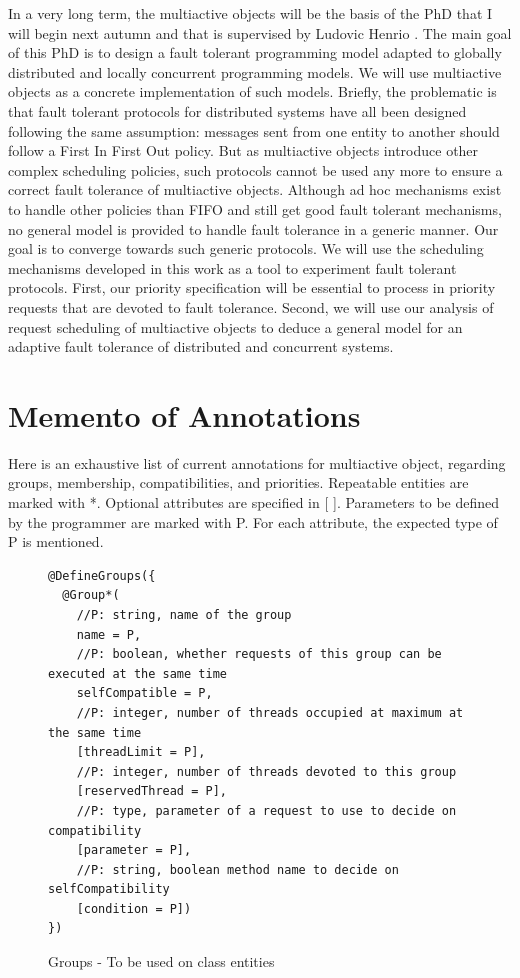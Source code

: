 \documentclass[11pt]{report}
\begin{document}
In a very long term, the multiactive objects will be the basis of the PhD that I will begin next autumn and that is supervised by Ludovic Henrio \cite{ref:these}. The main goal of this PhD is to design a fault tolerant programming model adapted to globally distributed and locally concurrent programming models. We will use multiactive objects as a concrete implementation of such models. Briefly, the problematic is that fault tolerant protocols for distributed systems have all been designed following the same assumption: messages sent from one entity to another should follow a First In First Out policy. But as multiactive objects introduce other complex scheduling policies, such protocols cannot be used any more to ensure a correct fault tolerance of multiactive objects. Although ad hoc mechanisms exist to handle other policies than FIFO and still get good fault tolerant mechanisms, no general model is provided to handle fault tolerance in a generic manner. Our goal is to converge towards such generic protocols. We will use the scheduling mechanisms developed in this work as a tool to experiment fault tolerant protocols. First, our priority specification will be essential to process in priority requests that are devoted to fault tolerance. Second, we will use our analysis of request scheduling of multiactive objects to deduce a general model for an adaptive fault tolerance of distributed and concurrent systems.





\appendix
\chapter{Memento of Annotations}

Here is an exhaustive list of current annotations for multiactive object, regarding groups, membership, compatibilities, and priorities. Repeatable entities are marked with *. Optional attributes are specified in [ ]. Parameters to be defined by the programmer are marked with P. For each attribute, the expected type of P is mentioned.\\

\begin{figure}[!ht]
	\lstset{language=java, numbers=left, numberstyle=\tiny, stepnumber=1, numbersep=5pt, basicstyle=\footnotesize}
	\begin{lstlisting}[frame=single]
@DefineGroups({
  @Group*(
    //P: string, name of the group
    name = P, 
    //P: boolean, whether requests of this group can be executed at the same time
    selfCompatible = P, 
    //P: integer, number of threads occupied at maximum at the same time
    [threadLimit = P],
    //P: integer, number of threads devoted to this group
    [reservedThread = P], 
    //P: type, parameter of a request to use to decide on compatibility
    [parameter = P],
    //P: string, boolean method name to decide on selfCompatibility
    [condition = P])
})
 	\end{lstlisting}
\caption{Groups - To be used on class entities}
\label{fig:group}
\end{figure}
\end{document}
